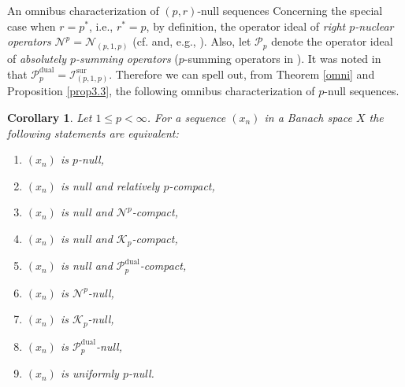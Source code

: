 \documentclass[a4paper,11pt]{amsart}
\newtheorem{cor}[prop]{Corollary}
\theoremstyle{definition}
\theoremstyle{definition}
\theoremstyle{definition}
\begin{document}
\begin{section}{An omnibus characterization of $(p,r)$-null sequences}
Concerning the special case when $r={p^{\ast}}$, i.e., ${r^{\ast}}=p$, by definition, the operator ideal of \emph{right $p$-nuclear operators} ${{\mathcal N}}^p= {{\mathcal N}}_{(p,1,p)}$ (cf. \cite[18.1.1]{P} and, e.g., \cite[p.~140]{Ry}). Also, let ${{\mathcal P}}_p$ denote the operator ideal of \emph{absolutely $p$-summing operators} ($p$-summing operators in \cite{DJT}). It was noted in \cite[p.~157]{ALO} that ${{\mathcal P}}_p^\mathrm{dual}= {{\mathcal I}}_{(p,1,p)}^\mathrm{sur}$. Therefore we can spell out, from Theorem \ref{omni} and Proposition \ref{prop3.3}, the following omnibus characterization of $p$-null  sequences.

\begin{cor}
Let $1 \leq p < \infty$. For a sequence $(x_n)$ in a Banach space $X$ the following statements are equivalent:
\begin{enumerate}
\item $(x_n)$ is $p$-null,
\item $(x_n)$ is null and relatively $p$-compact,
\item $(x_n)$ is null and ${{\mathcal N}}^p$-compact,
\item $(x_n)$ is null and ${{\mathcal K}}_p$-compact,
\item $(x_n)$ is null and ${{\mathcal P}}_p ^\mathrm{dual}$-compact,
\item $(x_n)$ is ${{\mathcal N}}^p$-null,
\item $(x_n)$ is ${{\mathcal K}}_p$-null,
\item $(x_n)$ is ${{\mathcal P}}_p^\mathrm{dual}$-null,
\item $(x_n)$ is uniformly $p$-null.
\end{enumerate}
\end{cor}

\end{section}
\end{document}
